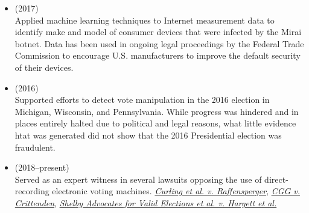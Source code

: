 \documentclass[11pt]{article}
\begin{document}
{\begin{itemize}[label={--\ },leftmargin=0.25in,labelsep=0.1625em]
\item{} (2017)\\
{\small Applied machine learning techniques to Internet measurement data to identify make and model of consumer devices that were infected by the Mirai botnet. Data has been used in ongoing legal proceedings by the Federal Trade Commission to encourage U.S. manufacturers to improve the default security of their devices.}
\item{} (2016)\\
{\small Supported efforts to detect vote manipulation in the 2016 election in Michigan, Wisconsin, and Pennsylvania. While progress was hindered and in places entirely halted due to political and legal reasons, what little evidence htat was generated did not show that the 2016 Presidential election was fraudulent.}
\end{itemize}

\begin{itemize}[label={--\ },leftmargin=0.25in,labelsep=0.1625em]
\addtolength{\itemsep}{-0.25\baselineskip}

\item{} (2018--present)\\
{\small Served as an expert witness in several lawsuits opposing the use of direct-recording electronic voting machines. {\it \href{https://www.theroot.com/brian-kemp-doesnt-need-to-rig-georgias-election-beca-1830233656}{Curling et al. v. Raffensperger}}, {\it \href{https://www.apnews.com/b3e8f250f50244478ae3bbf19399f6ff}{CGG v. Crittenden}}, {\it {\href{https://www.pacermonitor.com/public/case/25902838/Shelby_Advocates_for_Valid_Elections_et_al_v_Hargett_et_al}{Shelby Advocates for Valid Elections et al. v. Hargett et al.}}}}


\end{itemize}}
\end{document}
